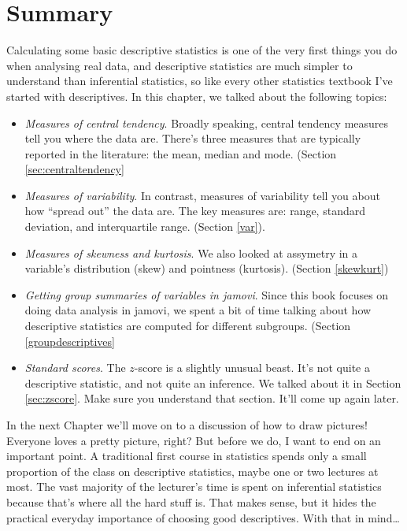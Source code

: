 \documentclass[
]{book}
\providecommand{\tightlist}{%
  \setlength{\itemsep}{0pt}\setlength{\parskip}{0pt}}
\begin{document}
\hypertarget{summary}{%
\section{Summary}\label{summary}}

Calculating some basic descriptive statistics is one of the very first things you do when analysing real data, and descriptive statistics are much simpler to understand than inferential statistics, so like every other statistics textbook I've started with descriptives. In this chapter, we talked about the following topics:

\begin{itemize}
\tightlist
\item
  \emph{Measures of central tendency}. Broadly speaking, central tendency measures tell you where the data are. There's three measures that are typically reported in the literature: the mean, median and mode. (Section \ref{sec:centraltendency}
\item
  \emph{Measures of variability}. In contrast, measures of variability tell you about how ``spread out'' the data are. The key measures are: range, standard deviation, and interquartile range. (Section \ref{var}).
\item
  \emph{Measures of skewness and kurtosis}. We also looked at assymetry in a variable's distribution (skew) and pointness (kurtosis). (Section \ref{skewkurt})
\item
  \emph{Getting group summaries of variables in jamovi}. Since this book focuses on doing data analysis in jamovi, we spent a bit of time talking about how descriptive statistics are computed for different subgroups. (Section \ref{groupdescriptives}
\item
  \emph{Standard scores}. The \(z\)-score is a slightly unusual beast. It's not quite a descriptive statistic, and not quite an inference. We talked about it in Section \ref{sec:zscore}. Make sure you understand that section. It'll come up again later.
\end{itemize}

In the next Chapter we'll move on to a discussion of how to draw pictures! Everyone loves a pretty picture, right? But before we do, I want to end on an important point. A traditional first course in statistics spends only a small proportion of the class on descriptive statistics, maybe one or two lectures at most. The vast majority of the lecturer's time is spent on inferential statistics because that's where all the hard stuff is. That makes sense, but it hides the practical everyday importance of choosing good descriptives. With that in mind\ldots
\end{document}
